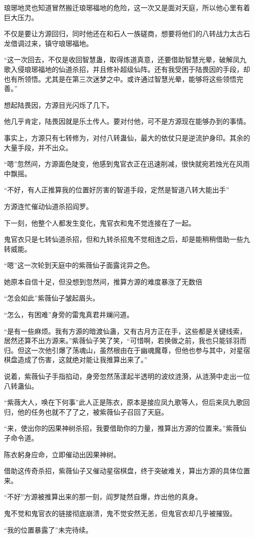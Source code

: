 \begin{this_body}
琅琊地灵也知道冒然搬迁琅琊福地的危险，这一次又是面对天庭，所以他心里有着巨大压力。

不仅是要让方源回归，同时他还在和石人一族磋商，想要将他们的八转战力太古石龙借调过来，镇守琅琊福地。

“这一次回去，不仅是收回智慧蛊，取得炼道真意，还要借助智慧光晕，破解凤九歌入侵琅琊福地的仙道杀招，并且修补超级仙阵。还有我受困于陆畏因的手段，却也有所领悟。尤其是在第三次迷梦之中。或许通过智慧光晕，能够将这些领悟完善。”

想起陆畏因，方源目光闪烁了几下。

他几乎肯定，陆畏因就是乐土传人。要对付他，可不是方源现在能够办到的事情。

事实上，方源只有七转修为，对付八转蛊仙，最大的依仗只是逆流护身印。其余的大量手段，并不出众。

“嗯”忽然间，方源面色陡变，他感到鬼官衣正在迅速削减，很快就宛若烛光在风雨中飘摇。

“不好，有人正推算我的位置好厉害的智道手段，定然是智道八转大能出手”

方源连忙催动仙道杀招阎罗。

下一刻，他整个人都发生变化，鬼官衣和鬼不觉连接在了一起。

鬼官衣只是七转仙道杀招，但和九转杀招鬼不觉相连之后，却是能稍稍借助一些九转威能。

“嗯”这一次轮到天庭中的紫薇仙子面露诧异之色。

她原本自信十足，但没想到忽然间，推算方源的难度暴涨了无数倍

“怎会如此”紫薇仙子皱起眉头。

“怎么，有困难”身旁的雷鬼真君井斓问道。

“是有一些麻烦。我有方源的暗渡仙蛊，又有古月方正在手，这些都是关键线索，居然还算不出方源来。”紫薇仙子笑了笑，“可惜啊，若换做之前，我也只能铩羽而归。但这一次他引爆了荡魂山，虽然根由在于幽魂魔尊，但他也参与其中，对星宿棋盘造成了伤害，这就绝对能让我推算出来了。”

说着，紫薇仙子手指掐动，身旁忽然荡漾起半透明的波纹涟漪，从涟漪中走出一位八转蛊仙。

“紫薇大人，唤在下何事”此人正是陈衣，原本是接应凤九歌等人，但后来凤九歌回归，他的任务也就不了了之，被紫薇仙子召回了天庭。

“来，使出你的因果神树杀招，我要借助你的力量，推算出方源的位置来。”紫薇仙子命令道。

陈衣躬身应命，立即催动出因果神树。

借助这传奇杀招，紫薇仙子又催动星宿棋盘，终于突破难关，算出方源的具体位置来。

“不好”方源被推算出来的那一刻，阎罗陡然自爆，炸出他的真身。

鬼不觉和鬼官衣的链接彻底崩溃，鬼不觉安然无恙，但鬼官衣却几乎被摧毁。

“我的位置暴露了”未完待续。

\end{this_body}

